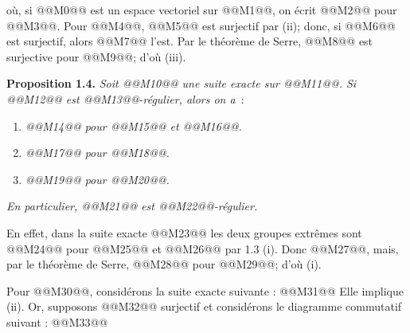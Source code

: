 
où, si @@M0@@ est un
espace vectoriel sur @@M1@@, on écrit @@M2@@ pour @@M3@@. Pour @@M4@@, @@M5@@ est surjectif par (ii); donc, si @@M6@@ est surjectif, alors @@M7@@ l'est. Par le théorème de Serre, @@M8@@ est surjective pour @@M9@@; d'où (iii).

\textbf{Proposition 1.4.} \emph{Soit @@M10@@ une suite exacte sur @@M11@@. Si @@M12@@ est @@M13@@-régulier, alors on a}~:
\begin{enumerate}[label=(\roman*)]
\item \emph{@@M14@@ pour @@M15@@ et @@M16@@.}
\item \emph{@@M17@@ pour @@M18@@.}
\item \emph{@@M19@@ pour @@M20@@.}
\end{enumerate}
\emph{En particulier, @@M21@@ est @@M22@@-régulier.}

En effet, dans la suite exacte
@@M23@@
les deux groupes extrêmes sont @@M24@@ pour @@M25@@ et @@M26@@ par 1.3 (i). Donc @@M27@@, mais, par le théorème de Serre, @@M28@@ pour @@M29@@; d'où (i).

Pour @@M30@@, considérons la suite exacte suivante :
@@M31@@
Elle implique (ii). Or, supposons @@M32@@ surjectif et considérons le diagramme commutatif suivant :
@@M33@@
